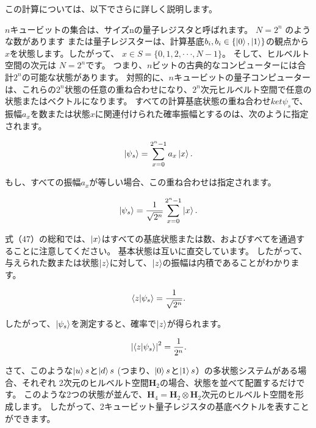 この計算については、以下でさらに詳しく説明します。

$n$キュービットの集合は、サイズnの量子レジスタと呼ばれます。 $N = 2^n$ のような数があります
または量子レジスターは、計算基底$b_i, b_i \in \{ \ket{0},\ket{1} \}$の観点から$x$を状態します。したがって、 $ x \in S= \{0,1,2, \cdot \cdot \cdot, N-1 \} $。
そして、ヒルベルト空間の次元は $N = 2^n$です。 つまり、$n$ビットの古典的なコンピューターには合計$2^n$の可能な状態があります。 対照的に、$n$キュービットの量子コンピューターは、これらの$2^n$状態の任意の重ね合わせになり、$2^n$次元ヒルベルト空間で任意の状態またはベクトルになります。 すべての計算基底状態の重ね合わせ$ket{\psi_s}$で、振幅$a_x$を数または状態$x$に関連付けられた確率振幅とするのは、次のように指定されます。


\begin{equation}
\label{46}
\ket{\psi_s} = \sum_{x=0}^{2^n - 1} a_x \ket{x}.
\end{equation}

もし、すべての振幅$a_x$が等しい場合、この重ね合わせは指定されます。

\begin{equation}
\label{47}
\ket{\psi_s} = \frac{1}{\sqrt{2^n}} \sum_{x=0}^{2^n - 1}  \ket{x}.
\end{equation}

式（47）の総和では、$\ket{x}$はすべての基底状態または数、およびすべてを通過することに注意してください。
基本状態は互いに直交しています。 したがって、与えられた数または状態$\ket{z}$に対して、$\ket{z}$の振幅は内積であることがわかります。

\begin{equation}
\label{48}
\braket{z | \psi_s} = \frac{1}{\sqrt{2^n}}.
\end{equation}

したがって、$\ket{\psi_s}$を測定すると、確率で$\ket{z}$が得られます。

\begin{equation}
\label{49}
\left| \braket{z | \psi_s} \right|^2 = \frac{1}{2^n}.
\end{equation}


さて、このような$\ket{u}s$と$\ket{d}s $ (つまり、$\ket{0}s$と$\ket{1}s$）の多状態システムがある場合、それぞれ
2次元のヒルベルト空間$\mathbf{H}_2$の場合、状態を並べて配置するだけです。 このような2つの状態が並んで、$\mathbf{H}_4 = \mathbf{H}_2 \otimes \mathbf{H}_2 $次元のヒルベルト空間を形成します。 したがって、2キュービット量子レジスタの基底ベクトルを表すことができます。



